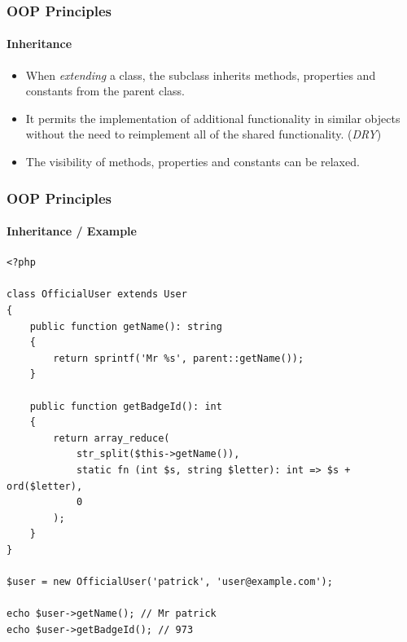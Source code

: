\begin{frame}
    \frametitle{OOP Principles}
    \framesubtitle{Inheritance}

    \begin{itemize}[<+->]
        \item When \textit{extending} a class, the subclass inherits methods, properties and constants from the parent class.
        \item It permits the implementation of additional functionality in similar objects without the need to reimplement all of the shared functionality. (\textit{DRY})
        \item The visibility of methods, properties and constants can be relaxed.
    \end{itemize}
\end{frame}

\begin{frame}[fragile,c]
    \frametitle{OOP Principles}
    \framesubtitle{Inheritance / Example}

    \begin{lstlisting}
<?php

class OfficialUser extends User
{
    public function getName(): string
    {
        return sprintf('Mr %s', parent::getName());
    }

    public function getBadgeId(): int
    {
        return array_reduce(
            str_split($this->getName()),
            static fn (int $s, string $letter): int => $s + ord($letter),
            0
        );
    }
}

$user = new OfficialUser('patrick', 'user@example.com');

echo $user->getName(); // Mr patrick
echo $user->getBadgeId(); // 973
    \end{lstlisting}
\end{frame}

